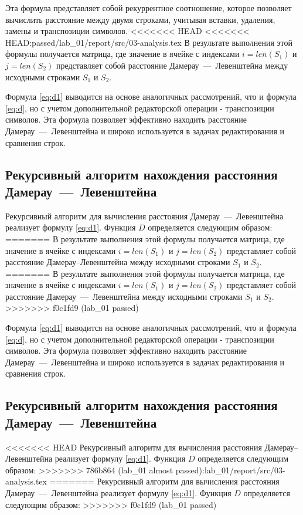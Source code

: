 Эта формула представляет собой рекуррентное соотношение, которое позволяет вычислить расстояние между двумя строками, учитывая вставки, удаления, замены и транспозиции символов. 
<<<<<<< HEAD
<<<<<<< HEAD:passed/lab_01/report/src/03-analysis.tex
В результате выполнения этой формулы получается матрица, где значение в ячейке с индексами $i = len	(S_{1})$ и $j = len(S_{2})$ представляет собой расстояние Дамерау~---~Левенштейна между исходными строками $S_{1}$ и $S_{2}$.

Формула \ref{eq:d1} выводится на основе аналогичных рассмотрений, что и формула \ref{eq:d}, но с учетом дополнительной редакторской операции - транспозиции символов. 
Эта формула позволяет эффективно находить расстояние Дамерау~---~Левенштейна и широко используется в задачах редактирования и сравнения строк.

\newpage
\subsection{Рекурсивный алгоритм нахождения расстояния Дамерау~---~Левенштейна}

Рекурсивный алгоритм для вычисления расстояния Дамерау~---~Левенштейна реализует формулу \ref{eq:d1}. Функция $D$ определяется следующим образом:
=======
В результате выполнения этой формулы получается матрица, где значение в ячейке с индексами $i = len	(S_{1})$ и $j = len(S_{2})$ представляет собой расстояние Дамерау--Левенштейна между исходными строками $S_{1}$ и $S_{2}$.
=======
В результате выполнения этой формулы получается матрица, где значение в ячейке с индексами $i = len	(S_{1})$ и $j = len(S_{2})$ представляет собой расстояние Дамерау~---~Левенштейна между исходными строками $S_{1}$ и $S_{2}$.
>>>>>>> f0c1fd9 (lab_01 passed)

Формула \ref{eq:d1} выводится на основе аналогичных рассмотрений, что и формула \ref{eq:d}, но с учетом дополнительной редакторской операции - транспозиции символов. 
Эта формула позволяет эффективно находить расстояние Дамерау~---~Левенштейна и широко используется в задачах редактирования и сравнения строк.

\newpage
\subsection{Рекурсивный алгоритм нахождения расстояния Дамерау~---~Левенштейна}

<<<<<<< HEAD
Рекурсивный алгоритм для вычисления расстояния Дамерау--Левенштейна реализует формулу \ref{eq:d1}. Функция $D$ определяется следующим образом:
>>>>>>> 786b864 (lab_01 almost passed):lab_01/report/src/03-analysis.tex
=======
Рекурсивный алгоритм для вычисления расстояния Дамерау~---~Левенштейна реализует формулу \ref{eq:d1}. Функция $D$ определяется следующим образом:
>>>>>>> f0c1fd9 (lab_01 passed)

